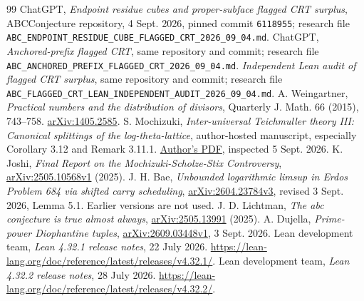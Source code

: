 \documentclass[11pt]{amsart}
\theoremstyle{definition}
\theoremstyle{remark}
\newcommand{\N}{\mathbb N}
\newcommand{\R}{\mathbb R}
\newcommand{\Z}{\mathbb Z}
\newcommand{\rad}{\operatorname{rad}}
\begin{document}
\begin{thebibliography}{99}
\begingroup
\let\rad\relax
\newcommand{\rad}{\operatorname{rad}}
\let\dist\relax
\newcommand{\dist}{\operatorname{dist}}
\let\FCRT\relax
\newcommand{\FCRT}{\mathrm{FCRT}}
\let\SCRT\relax
\newcommand{\SCRT}{\mathrm{SCRT}}
\let\PBT\relax
\newcommand{\PBT}{\mathrm{PBT}}
\let\pos\relax
\newcommand{\pos}[1]{\left(#1\right)_+}
\let\N\relax
\newcommand{\N}{\mathbb N}
\let\Z\relax
\newcommand{\Z}{\mathbb Z}
\let\R\relax
\newcommand{\R}{\mathbb R}
\small
{} ChatGPT, \emph{Endpoint residue cubes and proper-subface flagged CRT surplus}, ABCConjecture repository, 4 Sept. 2026, pinned commit \texttt{6118955}; research file \texttt{ABC\_ENDPOINT\_RESIDUE\_CUBE\_FLAGGED\_CRT\_2026\_09\_04.md}.
 ChatGPT, \emph{Anchored-prefix flagged CRT}, same repository and commit; research file \texttt{ABC\_ANCHORED\_PREFIX\_FLAGGED\_CRT\_2026\_09\_04.md}.
 \emph{Independent Lean audit of flagged CRT surplus}, same repository and commit; research file \texttt{ABC\_FLAGGED\_CRT\_LEAN\_INDEPENDENT\_AUDIT\_2026\_09\_04.md}.
 A. Weingartner, \emph{Practical numbers and the distribution of divisors}, Quarterly J. Math. 66 (2015), 743--758. \href{https://arxiv.org/abs/1405.2585}{arXiv:1405.2585}.
 S. Mochizuki, \emph{Inter-universal Teichmuller theory III: Canonical splittings of the log-theta-lattice}, author-hosted manuscript, especially Corollary 3.12 and Remark 3.11.1. \href{https://www.kurims.kyoto-u.ac.jp/~motizuki/Inter-universal\%20Teichmuller\%20Theory\%20III.pdf}{Author's PDF}, inspected 5 Sept. 2026.
 K. Joshi, \emph{Final Report on the Mochizuki-Scholze-Stix Controversy}, \href{https://arxiv.org/abs/2505.10568}{arXiv:2505.10568v1} (2025).
 J. H. Bae, \emph{Unbounded logarithmic limsup in Erdos Problem 684 via shifted carry scheduling}, \href{https://arxiv.org/abs/2604.23784}{arXiv:2604.23784v3}, revised 3 Sept. 2026, Lemma 5.1. Earlier versions are not used.
 J. D. Lichtman, \emph{The abc conjecture is true almost always}, \href{https://arxiv.org/abs/2505.13991}{arXiv:2505.13991} (2025).
 A. Dujella, \emph{Prime-power Diophantine tuples}, \href{https://arxiv.org/abs/2609.03448}{arXiv:2609.03448v1}, 3 Sept. 2026.
 Lean development team, \emph{Lean 4.32.1 release notes}, 22 July 2026. \url{https://lean-lang.org/doc/reference/latest/releases/v4.32.1/}.
 Lean development team, \emph{Lean 4.32.2 release notes}, 28 July 2026. \url{https://lean-lang.org/doc/reference/latest/releases/v4.32.2/}.


\end{thebibliography}
\end{document}
